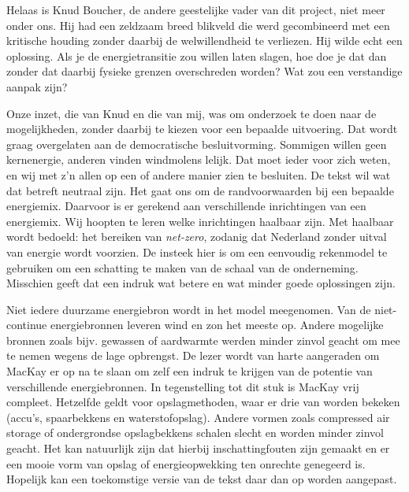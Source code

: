 \documentclass[
  11pt,
  a4paper,
]{book}
\begin{document}
Helaas is Knud Boucher, de andere geestelijke vader van dit project, niet meer onder ons. Hij had een zeldzaam breed blikveld die werd gecombineerd met een kritische houding zonder daarbij de welwillendheid te verliezen. Hij wilde echt een oplossing. Als je de energietransitie zou willen laten slagen, hoe doe je dat dan zonder dat daarbij fysieke grenzen overschreden worden? Wat zou een verstandige aanpak zijn?

Onze inzet, die van Knud en die van mij, was om onderzoek te doen naar de mogelijkheden, zonder daarbij te kiezen voor een bepaalde uitvoering. Dat wordt graag overgelaten aan de democratische besluitvorming. Sommigen willen geen kernenergie, anderen vinden windmolens lelijk. Dat moet ieder voor zich weten, en wij met z'n allen op een of andere manier zien te besluiten. De tekst wil wat dat betreft neutraal zijn. Het gaat ons om de randvoorwaarden bij een bepaalde energiemix. Daarvoor is er gerekend aan verschillende inrichtingen van een energiemix. Wij hoopten te leren welke inrichtingen haalbaar zijn. Met haalbaar wordt bedoeld: het bereiken van \emph{net-zero}, zodanig dat Nederland zonder uitval van energie wordt voorzien. De insteek hier is om een eenvoudig rekenmodel te gebruiken om een schatting te maken van de schaal van de onderneming. Misschien geeft dat een indruk wat betere en wat minder goede oplossingen zijn.

Niet iedere duurzame energiebron wordt in het model meegenomen. Van de niet-continue energiebronnen leveren wind en zon het meeste op. Andere mogelijke bronnen zoals bijv. gewassen of aardwarmte werden minder zinvol geacht om mee te nemen wegens de lage opbrengst. De lezer wordt van harte aangeraden om MacKay er op na te slaan om zelf een indruk te krijgen van de potentie van verschillende energiebronnen. In tegenstelling tot dit stuk is MacKay vrij compleet. Hetzelfde geldt voor opslagmethoden, waar er drie van worden bekeken (accu's, spaarbekkens en waterstofopslag). Andere vormen zoals compressed air storage of ondergrondse opslagbekkens schalen slecht en worden minder zinvol geacht. Het kan natuurlijk zijn dat hierbij inschattingfouten zijn gemaakt en er een mooie vorm van opslag of energieopwekking ten onrechte genegeerd is. Hopelijk kan een toekomstige versie van de tekst daar dan op worden aangepast.
\end{document}
